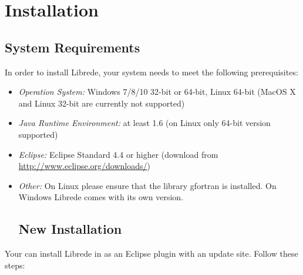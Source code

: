 \section{Installation}
\subsection{System Requirements}
In order to install Librede, your system needs to meet the following prerequisites:
\begin{itemize}
\item \emph{Operation System:} Windows 7/8/10 32-bit or 64-bit, Linux 64-bit (MacOS X and Linux 32-bit are currently not supported)
\item \emph{Java Runtime Environment:} at least 1.6 (on Linux only 64-bit version supported)
\item \emph{Eclipse:} Eclipse Standard 4.4 or higher (download from \url{http://www.eclipse.org/downloads/})
\item \emph{Other:} On Linux please ensure that the library gfortran is installed. On Windows Librede comes with its own version.

\subsection{New Installation}
\end{itemize}

Your can install Librede in as an Eclipse plugin with an update site. Follow these steps:

